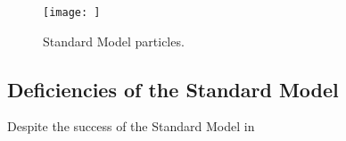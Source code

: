 \begin{figure}
   \begin{center}
      \texttt{[image: ]}
      \caption{Standard Model particles.}
      \label{fig:StandardModelTable}
   \end{center}
\end{figure}

\subsection{Deficiencies of the Standard Model\label{sec:SMdeficiencies}}



Despite the success of the Standard Model in 
